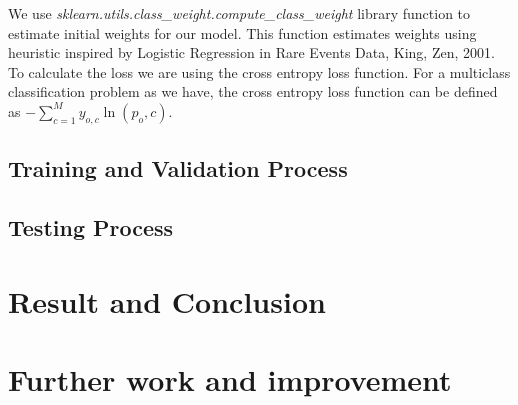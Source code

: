 \documentclass[a4paper, 12pt]{article}
\begin{document}
\begin{sloppypar}
  We use \textit{sklearn.utils.class\_weight.compute\_class\_weight} library function to estimate initial weights for our model. This function estimates weights using heuristic inspired by  Logistic Regression in Rare Events Data, King, Zen, 2001.\cite{king_logistic_2001}
  To calculate the loss we are using the cross entropy loss function. For a multiclass classification problem as we have, the cross entropy loss function can be defined as \large $- \sum_{c=1}^{M} y_{o,c} \ln(p_o,c)$.\cite{noauthor_loss_nodate}
  \normalsize
  
  \subsection{Training and Validation Process}
  
  \subsection{Testing Process}
  
  \section{Result and Conclusion}
  
  \section{Further work and improvement}
  
\clearpage
\printbibliography[heading=bibintoc]
\clearpage

\end{sloppypar}
\end{document}
